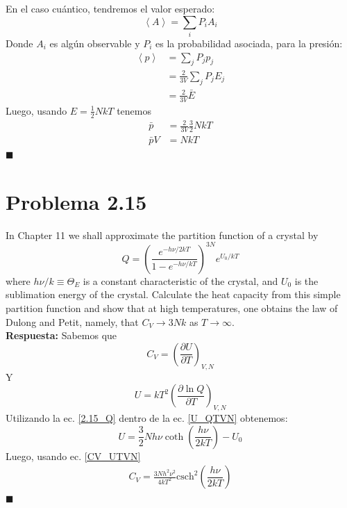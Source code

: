\documentclass[]{article}
\numberwithin{equation}{section}
\newcommand{\0}{\textcolor{gray}{0}}
\newcommand{\deriv}[3]{\left(\frac{\partial #1}{\partial #2} \right)_{#3}}
\newcommand{\qed}{\hfill\(\blacksquare\)}
\begin{document}
En el caso cuántico, tendremos el valor esperado:
\begin{equation}
	\left\langle A \right\rangle = \sum_{i} P_i A_i \label{quantum_expectated}
\end{equation}
Donde \(A_i\) es algún observable y \(P_i\) es la probabilidad asociada, para la presión:
\begin{align}
	\left\langle p \right\rangle &= \sum_{j} P_j p_j\nonumber\\
	&= \frac{2}{3 V} \sum_{j} P_j E_j\nonumber\\
	&= \frac{2}{3 V} \bar{E}\nonumber
\end{align}
Luego, usando $E=\frac{1}{2} N k T$ tenemos
\begin{align}
	\bar{p} &= \frac{2}{3 V}\frac{3}{2} N k T\nonumber\\
	\bar{p}V &= N k T
\end{align}
\qed

\section{Problema 2.15}
In Chapter 11 we shall approximate the partition function of a crystal by
\begin{equation}
	Q = \left(\frac{e^{-h \nu / 2 k T}}{1-e^{-h \nu / k T}}\right)^{3 N} e^{U_0 / k T}\label{2.15_Q}
\end{equation}
where $h \nu / k \equiv \Theta_E$ is a constant characteristic of the crystal, and $U_0$ is the sublimation energy of the crystal. Calculate the heat capacity from this simple partition function and show that at high temperatures, one obtains the law of Dulong and Petit, namely, that $C_V \rightarrow 3 N k$ as $T \rightarrow \infty$.
\\

\textbf{Respuesta:}
Sabemos que
\begin{equation}
	C_V = \deriv{U}{T}{V,N}\label{CV_UTVN}
\end{equation}
Y 
\begin{equation}
	U = k T^2 \deriv{\ln Q}{T}{V,N}\label{U_QTVN}
\end{equation}
Utilizando la ec. \ref{2.15_Q} dentro de la ec. \ref{U_QTVN} obtenemos:
\begin{equation}
	U = \frac{3}{2} N h \nu \coth \left(\frac{h \nu }{2 k T}\right) - U_0
\end{equation}
Luego, usando ec. \ref{CV_UTVN}
\begin{align}
	C_V = \frac{3 N h^2 \nu ^2 }{4 k T^2}\text{csch}^2\left(\dfrac{h \nu }{2 k T}\right)
\end{align}
\qed
\end{document}
